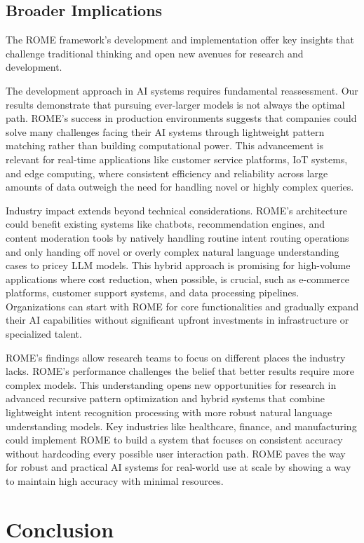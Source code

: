 \documentclass[12pt]{article}
\begin{document}
\subsection{Broader Implications}
The ROME framework's development and implementation offer key insights that challenge traditional thinking and open new avenues for research and development.

The development approach in AI systems requires fundamental reassessment. Our results demonstrate that pursuing ever-larger models is not always the optimal path. ROME's success in production environments suggests that companies could solve many challenges facing their AI systems through lightweight pattern matching rather than building computational power. This advancement is relevant for real-time applications like customer service platforms, IoT systems, and edge computing, where consistent efficiency and reliability across large amounts of data outweigh the need for handling novel or highly complex queries.

Industry impact extends beyond technical considerations. ROME's architecture could benefit existing systems like chatbots, recommendation engines, and content moderation tools by natively handling routine intent routing operations and only handing off novel or overly complex natural language understanding cases to pricey LLM models. This hybrid approach is promising for high-volume applications where cost reduction, when possible, is crucial, such as e-commerce platforms, customer support systems, and data processing pipelines. Organizations can start with ROME for core functionalities and gradually expand their AI capabilities without significant upfront investments in infrastructure or specialized talent.

ROME's findings allow research teams to focus on different places the industry lacks. ROME's performance challenges the belief that better results require more complex models. This understanding opens new opportunities for research in advanced recursive pattern optimization and hybrid systems that combine lightweight intent recognition processing with more robust natural language understanding models. Key industries like healthcare, finance, and manufacturing could implement ROME to build a system that focuses on consistent accuracy without hardcoding every possible user interaction path. ROME paves the way for robust and practical AI systems for real-world use at scale by showing a way to maintain high accuracy with minimal resources.

\section{Conclusion}
\end{document}
